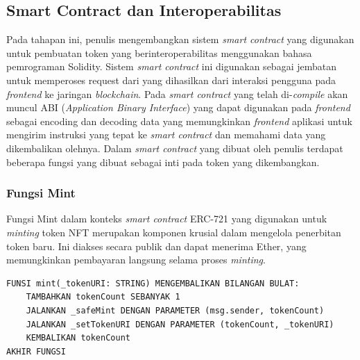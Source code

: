 \subsection{Smart Contract dan Interoperabilitas}
Pada tahapan ini, penulis mengembangkan sistem \emph{smart contract} yang digunakan untuk pembuatan token yang berinteroperabilitas menggunakan bahasa pemrograman Solidity. Sistem \emph{smart contract} ini digunakan sebagai jembatan untuk memperoses request dari yang dihasilkan dari interaksi pengguna pada \emph{frontend} ke jaringan \emph{blockchain}. Pada \emph{smart contract} yang telah di-\emph{compile} akan muncul ABI (\emph{Application Binary Interface}) yang dapat digunakan pada \emph{frontend} sebagai encoding dan decoding data yang memungkinkan \emph{frontend} aplikasi untuk mengirim instruksi yang tepat ke \emph{smart contract} dan memahami data yang dikembalikan olehnya. Dalam \emph{smart contract} yang dibuat oleh penulis terdapat beberapa fungsi yang dibuat sebagai inti pada token yang dikembangkan.

\subsubsection{Fungsi Mint}
Fungsi Mint dalam konteks \emph{smart contract } ERC-721 yang digunakan untuk \emph{minting} token NFT merupakan komponen krusial dalam mengelola penerbitan token baru. Ini diakses secara publik dan dapat menerima Ether, yang memungkinkan pembayaran langsung selama proses \emph{minting}.

\begin{lstlisting}[caption=Fungsi Mint]
FUNSI mint(_tokenURI: STRING) MENGEMBALIKAN BILANGAN BULAT:
    TAMBAHKAN tokenCount SEBANYAK 1
    JALANKAN _safeMint DENGAN PARAMETER (msg.sender, tokenCount)
    JALANKAN _setTokenURI DENGAN PARAMETER (tokenCount, _tokenURI)
    KEMBALIKAN tokenCount
AKHIR FUNGSI
\end{lstlisting}

